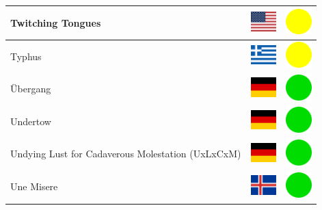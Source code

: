 \documentclass[12pt, a4paper, twoside]{report}
\begin{document}
\begin{center}
\begin{longtable}{|p{5cm}|p{2cm}|p{2cm}|}
			Twitching Tongues & \includegraphics[width=1cm]{4x3/us} & \includegraphics[width=1cm]{likes/m} \\ \hline
			Typhus & \includegraphics[width=1cm]{4x3/gr} & \includegraphics[width=1cm]{likes/m} \\ \hline
			Übergang & \includegraphics[width=1cm]{4x3/de} & \includegraphics[width=1cm]{likes/y} \\ \hline
			Undertow & \includegraphics[width=1cm]{4x3/de} & \includegraphics[width=1cm]{likes/y} \\ \hline
			Undying Lust for Cadaverous Molestation (UxLxCxM) & \includegraphics[width=1cm]{4x3/de} & \includegraphics[width=1cm]{likes/y} \\ \hline
			Une Misere & \includegraphics[width=1cm]{4x3/is} & \includegraphics[width=1cm]{likes/y} \\ \hline

\end{longtable}
\end{center}
\end{document}
